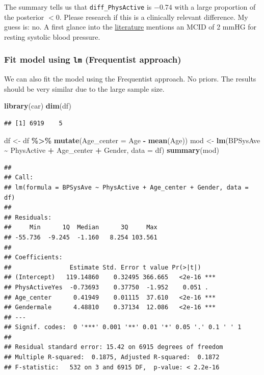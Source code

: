 \documentclass[
]{book}
\newenvironment{Shaded}{\begin{snugshade}}{\end{snugshade}}
\newcommand{\AttributeTok}[1]{\textcolor[rgb]{0.13,0.29,0.53}{#1}}
\newcommand{\FunctionTok}[1]{\textcolor[rgb]{0.13,0.29,0.53}{\textbf{#1}}}
\newcommand{\NormalTok}[1]{#1}
\newcommand{\OtherTok}[1]{\textcolor[rgb]{0.56,0.35,0.01}{#1}}
\newcommand{\SpecialCharTok}[1]{\textcolor[rgb]{0.81,0.36,0.00}{\textbf{#1}}}
\begin{document}
The summary tells us that \texttt{diff\_PhysActive} is \(-0.74\) with a large proportion
of the posterior \(<0\). Please research if this is a clinically relevant difference.
My guess is: no. A first glance into the \href{https://journals.sagepub.com/doi/10.1177/00368504221101636}{literature}
mentions an MCID of 2 mmHG for resting systolic blood pressure.

\subsubsection{\texorpdfstring{Fit model using \texttt{lm} (Frequentist approach)}{Fit model using lm (Frequentist approach)}}\label{fit-model-using-lm-frequentist-approach}

We can also fit the model using the Frequentist approach.
No priors. The results should be very similar due to the large sample size.

\begin{Shaded}
\begin{Highlighting}[]
\FunctionTok{library}\NormalTok{(car)}
\FunctionTok{dim}\NormalTok{(df) }
\end{Highlighting}
\end{Shaded}

\begin{verbatim}
## [1] 6919    5
\end{verbatim}

\begin{Shaded}
\begin{Highlighting}[]
\NormalTok{df }\OtherTok{\textless{}{-}}\NormalTok{ df }\SpecialCharTok{\%\textgreater{}\%} \FunctionTok{mutate}\NormalTok{(}\AttributeTok{Age\_center =}\NormalTok{ Age }\SpecialCharTok{{-}} \FunctionTok{mean}\NormalTok{(Age))}
\NormalTok{mod }\OtherTok{\textless{}{-}} \FunctionTok{lm}\NormalTok{(BPSysAve }\SpecialCharTok{\textasciitilde{}}\NormalTok{ PhysActive }\SpecialCharTok{+}\NormalTok{ Age\_center }\SpecialCharTok{+}\NormalTok{ Gender, }\AttributeTok{data =}\NormalTok{ df)}
\FunctionTok{summary}\NormalTok{(mod)}
\end{Highlighting}
\end{Shaded}

\begin{verbatim}
## 
## Call:
## lm(formula = BPSysAve ~ PhysActive + Age_center + Gender, data = df)
## 
## Residuals:
##     Min      1Q  Median      3Q     Max 
## -55.736  -9.245  -1.160   8.254 103.561 
## 
## Coefficients:
##                Estimate Std. Error t value Pr(>|t|)    
## (Intercept)   119.14860    0.32495 366.665   <2e-16 ***
## PhysActiveYes  -0.73693    0.37750  -1.952    0.051 .  
## Age_center      0.41949    0.01115  37.610   <2e-16 ***
## Gendermale      4.48810    0.37134  12.086   <2e-16 ***
## ---
## Signif. codes:  0 '***' 0.001 '**' 0.01 '*' 0.05 '.' 0.1 ' ' 1
## 
## Residual standard error: 15.42 on 6915 degrees of freedom
## Multiple R-squared:  0.1875, Adjusted R-squared:  0.1872 
## F-statistic:   532 on 3 and 6915 DF,  p-value: < 2.2e-16
\end{verbatim}
\end{document}
